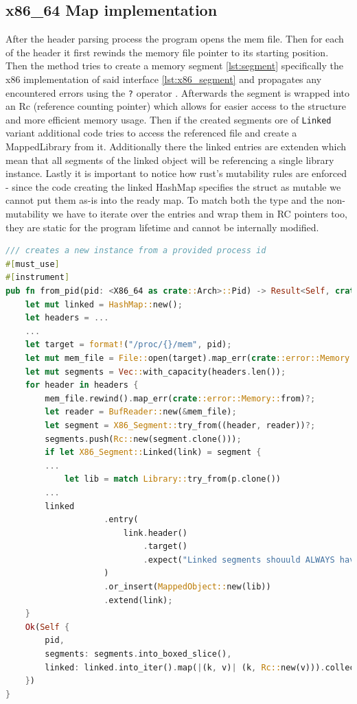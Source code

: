 \subsection{x86\_64 Map implementation}

After the header parsing process the program opens the mem file.
Then for each of the header it first rewinds the memory file pointer to its starting position.
Then the method tries to create a memory segment \ref{lst:segment} specifically the x86 implementation of said interface \ref{lst:x86_segment} and propagates any encountered errors using the \verb|?| operator \cite{TODO}.
Afterwards the segment is wrapped into an Rc (reference counting pointer) which allows for easier access to the structure and more efficient memory usage. 
Then if the created segments ore of \verb|Linked| variant additional code tries to access the referenced file and create a MappedLibrary from it.
Additionally there the linked entries are extenden which mean that all segments of the linked object will be referencing a single library instance.
Lastly it is important to notice how rust's mutability rules are enforced - since the code creating the linked HashMap specifies the struct as mutable we cannot put them as-is into the ready map.
To match both the type and the non-mutability we have to iterate over the entries and wrap them in RC pointers too, they are static for the program lifetime and cannot be internally modified. 

\begin{lstlisting}[caption=\label{lst:map_from_pid}"Excerpt from x86\_64 Map's from\_pid function", language=Rust, breaklines=true]
/// creates a new instance from a provided process id
#[must_use]
#[instrument]
pub fn from_pid(pid: <X86_64 as crate::Arch>::Pid) -> Result<Self, crate::error::Error> {
    let mut linked = HashMap::new();
    let headers = ...
    ...
    let target = format!("/proc/{}/mem", pid);
    let mut mem_file = File::open(target).map_err(crate::error::Memory::from)?;
    let mut segments = Vec::with_capacity(headers.len());
    for header in headers {
        mem_file.rewind().map_err(crate::error::Memory::from)?;
        let reader = BufReader::new(&mem_file);
        let segment = X86_Segment::try_from((header, reader))?;
        segments.push(Rc::new(segment.clone()));
        if let X86_Segment::Linked(link) = segment {
        ...
            let lib = match Library::try_from(p.clone())
        ...
        linked
                    .entry(
                        link.header()
                            .target()
                            .expect("Linked segments shouuld ALWAYS have a valid target"),
                    )
                    .or_insert(MappedObject::new(lib))
                    .extend(link);
    }
    Ok(Self {
        pid,
        segments: segments.into_boxed_slice(),
        linked: linked.into_iter().map(|(k, v)| (k, Rc::new(v))).collect(),
    })
}
\end{lstlisting}

